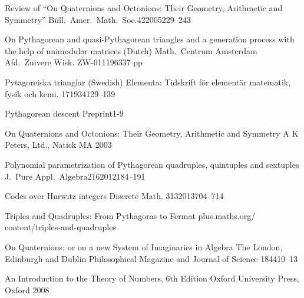 \documentclass[12pt,table]{article}
\theoremstyle{definition}
\theoremstyle{remark}
\numberwithin{equation}{section}
\begin{document}
\begin{thebibliography}{1}



        {Review of ``On Quaternions and Octonions: 
         Their Geometry, Arithmetic and Symmetry''}
        {Bull.\ Amer.\ Math.\ Soc.}{42}{2005}{229--243}



      {On Pythagorean and quasi-Pythagorean triangles and a
      generation process with the help of unimodular matrices (Dutch)}
      {Math.\ Centrum Amsterdam Afd.\ Zuivere Wisk.}
      {ZW-011}{1963}{37 pp}



        {Pytagoreiska trianglar (Swedish)} 
        {Elementa: Tidskrift f\"or element\"ar
        matematik, fysik och kemi.}
        {17}{1934}{129--139}

        {Pythagorean descent}
        {}
        {}{Preprint}{1-9}



     {On Quaternions and Octonions: 
      Their Geometry, Arithmetic and Symmetry}
     {A K Peters, Ltd., Natick MA}
     {2003}


       {Polynomial parametrization of Pythagorean quadruples,
        quintuples and sextuples}
       {J.\ Pure Appl.\ Algebra}{216}{2012}{184--191}


        {Codes over Hurwitz integers}
        {Discrete Math.}
        {313}{2013}{704--714}



      {Triples and Quadruples: From Pythagoras to Fermat}
      {plus.maths.org/ content/triples-and-quadruples}{}


        {On Quaternions; or on a new System of Imaginaries in Algebra}
        {The London, Edinburgh and Dublin Philosophical Magazine
         and Journal of Science}
        {1844}{10--13}



         {An Introduction to the Theory of Numbers, 6th Edition}
         {Oxford University Press, Oxford} 
         {2008}


\end{thebibliography}
\end{document}
